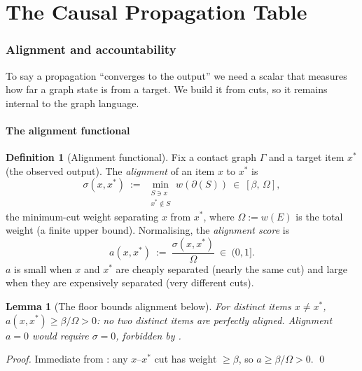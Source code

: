 \documentclass[11pt,twocolumn,a4paper]{article}
\theoremstyle{thmstyle}
\newtheorem{lemma}[theorem]{Lemma}
\theoremstyle{definition}
\newtheorem{definition}[theorem]{Definition}
\theoremstyle{remark}
\newcommand{\Gph}{\Gamma}
\newcommand{\E}{E}
\newcommand{\wt}{w}
\newcommand{\flo}{\beta}                 %
\newcommand{\cut}{\partial}              %
\newcommand{\str}{\sigma}                %
\begin{document}
\part{The Causal Propagation Table}

\section{Alignment and accountability}
\label{sec:alignment}

To say a propagation ``converges to the output'' we need a scalar that
measures how far a graph state is from a target. We build it from cuts, so
it remains internal to the graph language.

\subsection{The alignment functional}

\begin{definition}[Alignment functional]
\label{def:alignment}
Fix a contact graph $\Gph$ and a target item $x^{\ast}$ (the observed
output). The \emph{alignment} of an item $x$ to $x^{\ast}$ is
\[
\str(x,x^{\ast})\ :=\ \min_{\substack{S\ni x\\ x^{\ast}\notin S}}
\wt(\cut(S))\ \in\ [\flo,\,\Omega],
\]
the minimum-cut weight separating $x$ from $x^{\ast}$, where
$\Omega:=\wt(\E)$ is the total weight (a finite upper bound). Normalising,
the \emph{alignment score} is
\[
a(x,x^{\ast})\ :=\ \frac{\str(x,x^{\ast})}{\Omega}\ \in\ (0,1].
\]
$a$ is small when $x$ and $x^{\ast}$ are cheaply separated (nearly the same
cut) and large when they are expensively separated (very different cuts).
\end{definition}

\begin{lemma}[The floor bounds alignment below]
\label{lem:align-floor}
For distinct items $x\neq x^{\ast}$, $a(x,x^{\ast})\ge\flo/\Omega>0$:
no two distinct items are perfectly aligned. Alignment $a=0$ would require
$\str=0$, forbidden by .
\end{lemma}

\begin{proof}
Immediate from : any $x$--$x^{\ast}$ cut has weight
$\ge\flo$, so $a\ge\flo/\Omega>0$. \qed
\end{proof}
\end{document}
